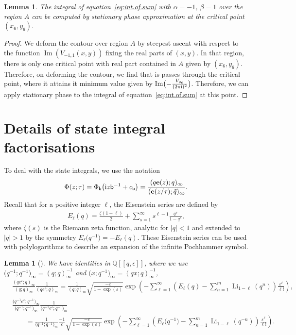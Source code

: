 \documentclass[pdftex]{sigma}
\numberwithin{equation}{section}
\newtheorem{Lemma}[Theorem]{Lemma}
\def\BQ{\mathbb{Q}}
\def\tq{\tilde{q}}
\def\be{\begin{equation}}
\def\ee{\end{equation}}
\def\Li{\mathrm{Li}}
\def\e{\mathbf e}
\def\BQ{\mathbb Q}
\def\tq{\tilde{q}}
\def\ve{\varepsilon}
\def\Li{\operatorname{Li}}
\def\Im{\operatorname{Im}}
\def\be{\begin{equation}}
\def\ee{\end{equation}}
\begin{document}
\begin{Lemma}\label{lem:Agood}
The integral of equation~\eqref{eq:int.of.sum} with $\alpha=-1$, $\beta=1$ over the region $A$ can be computed by stationary phase approximation at the critical point $(x_6,y_6)$.
\end{Lemma}
\begin{proof}
We deform the contour over region $A$ by steepest ascent with respect to the function $\Im(V_{-1,1}(x,y))$ fixing the real parts of $(x,y)$. In that region, there is only one critical point with real part contained in $A$ given by $(x_6,y_6)$. Therefore, on deforming the contour, we find that is passes through the critical point, where it attains it minimum value given by $\Im\bigl(-\frac{V_{\rho_6}}{(2\pi {\rm i})^2}\bigr)$. Therefore, we can apply stationary phase to the integral of equation~\eqref{eq:int.of.sum} at this point.
\end{proof}

\section{Details of state integral factorisations}
To deal with the state integrals, we use the notation
\[
 \Phi(z;\tau)
  =
 \Phi_{\mathsf{b}}\bigl({\rm i}z\mathsf{b}^{-1}+c_{\mathsf{b}}\bigr)
  =
 \frac{(q\e(z);q)_{\infty}}{(\e(z/\tau);\tq)_{\infty}} .
\]
Recall that for a positive integer $\ell$, the Eisenstein series are defined by
\be
\label{Eell}
\begin{aligned}
 E_{\ell}(q)
 =
 \frac{\zeta(1-\ell)}{2}+\sum_{s=1}^{\infty}s^{\ell-1}\frac{q^{s}}{1-q^s} ,
\end{aligned}
\ee
where $\zeta(s)$ is the Riemann zeta function, analytic for $|q|<1$ and extended to $|q|>1$ by the symmetry $E_{\ell}\bigl(q^{-1}\bigr) = -E_{\ell}(q)$. These Eisenstein series can be used with polylogarithms to describe an expansion of the infinite Pochhammer symbol.
\begin{Lemma}[\cite{GK:qser,GZ:qser}]
\label{lem.epexpansions}
We have identities in $\BQ[\![q,\epsilon]\!]$, where we use $\bigl(q^{-1};q^{-1}\bigr)_\infty=(q;q)_\infty^{-1}$ and $\bigl(x;q^{-1}\bigr)_\infty=(qx;q)_\infty^{-1}$,
\begin{align*}
&\frac{(qe^{\ve};q)_{\infty}}{(q;q)_{\infty}}\frac{1}{(qe^{\ve};q)_{m}} =
\frac{1}{(q;q)_{m}}\sqrt{\frac{-\ve}{1-\exp(\ve)}}
\exp\left(-\sum_{\ell=1}^{\infty}
 \left(E_{\ell}(q)-\sum_{n=1}^{m}\Li_{1-\ell}(q^{n})\right)
 \frac{\ve^\ell}{\ell!}\right) , \\
&\frac{\bigl(q^{-1}e^{\ve};q^{-1}\bigr)_{\infty}}{\bigl(q^{-1};q^{-1}\bigr)_{\infty}}
\frac{1}{\bigl(q^{-1}e^{\ve};q^{-1}\bigr)_{m}} \\
& \qquad =
\frac{1}{\bigl(q^{-1};q^{-1}\bigr)_{m}}\frac{-1}{\ve}\sqrt{\frac{-\ve}{1-\exp(\ve)}}
\exp\left(-\sum_{\ell=1}^{\infty}
 \left(E_{\ell}\bigl(q^{-1}\bigr)-\sum_{n=1}^{m}\Li_{1-\ell}(q^{-n})\right)
 \frac{\ve^{\ell}}{\ell!}\right) .
\end{align*}
\end{Lemma}
\end{document}
